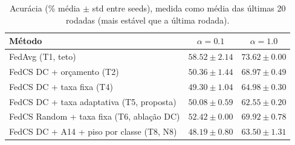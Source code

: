 \begin{table}[htbp]
\centering
\caption{Acurácia (\% média $\pm$ std entre seeds), medida como média das últimas 20 rodadas (mais estável que a última rodada).}
\label{tab:budget_results}
\begin{tabular}{lcc}
\toprule
Método & $\alpha=0.1$ & $\alpha=1.0$ \\
\midrule
FedAvg (T1, teto) & $58.52 \pm 2.14$ & $73.62 \pm 0.00$ \\
FedCS DC + orçamento (T2) & $50.36 \pm 1.44$ & $68.97 \pm 0.49$ \\
FedCS DC + taxa fixa (T4) & $49.30 \pm 1.04$ & $64.98 \pm 0.30$ \\
FedCS DC + taxa adaptativa (T5, proposta) & $50.08 \pm 0.59$ & $62.55 \pm 0.20$ \\
FedCS Random + taxa fixa (T6, ablação DC) & $52.42 \pm 0.00$ & $69.92 \pm 0.78$ \\
FedCS DC + A14 + piso por classe (T8, N8) & $48.19 \pm 0.80$ & $63.50 \pm 1.31$ \\
\bottomrule
\end{tabular}
\end{table}